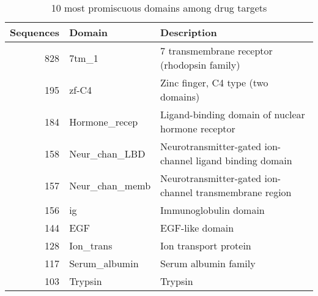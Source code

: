 \begin{table}
	\begin{center}
		\sf
		\begin{tabular}{r l l}
			\textbf{Sequences} & \textbf{Domain} & \textbf{Description} \\
			\hline
			 828 &  7tm\_1          & 7 transmembrane receptor (rhodopsin family)              \\
			 195 &  zf-C4          & Zinc finger, C4 type (two domains)                       \\
			 184 &  Hormone\_recep  & Ligand-binding domain of nuclear hormone receptor        \\
			 158 &  Neur\_chan\_LBD  & Neurotransmitter-gated ion-channel ligand binding domain \\
			 157 &  Neur\_chan\_memb & Neurotransmitter-gated ion-channel transmembrane region  \\
			 156 &  ig             & Immunoglobulin domain                                    \\
			 144 &  EGF            & EGF-like domain                                          \\
			 128 &  Ion\_trans      & Ion transport protein                                    \\
			 117 &  Serum\_albumin  & Serum albumin family                                     \\
			 103 &  Trypsin        & Trypsin                                                \\
			\hline
		\end{tabular}
		\caption{10 most promiscuous domains among drug targets}
	\end{center}
\end{table}

